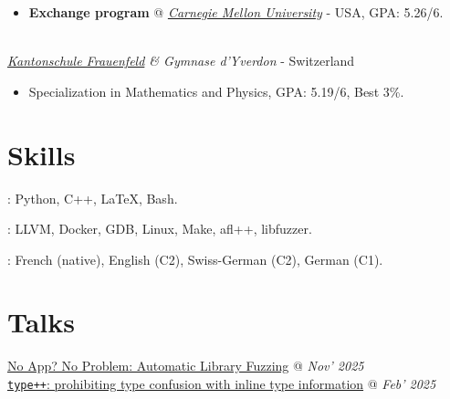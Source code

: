 \documentclass[mm, 11pt]{simple_style}
\begin{document}
\begin{resume}
\begin{itemize}
  \item \textbf{Exchange program} @
\textit{\href{https://www.ece.cmu.edu/}{Carnegie Mellon University}} - USA, GPA: 5.26/6.
\end{itemize}
\\
\textsl{\href{https://www.kanti-frauenfeld.ch/}{Kantonschule Frauenfeld} \& Gymnase d'Yverdon} - Switzerland

\begin{itemize}
  \item Specialization in Mathematics and Physics, GPA: 5.19/6, Best 3\%.
\end{itemize}

\sectionline
\section{Skills}
: Python, C++, \LaTeX, Bash.

: LLVM, Docker, GDB, Linux, Make, afl++, libfuzzer.

: French (native), English (C2), Swiss-German (C2), German (C1).\\
\pagebreak
\sectionline
\section{Talks}
\href{https://www.blackalps.ch/ba-25/talks.php#52}{No App? No Problem: Automatic Library Fuzzing} @ 
\hfill
\textit{Nov' 2025}\\
\href{https://www.ndss-symposium.org/ndss-paper/type-prohibiting-type-confusion-with-inline-type-information/}{\texttt{type++}: prohibiting type confusion with inline type information} @ 
\hfill
\textit{Feb' 2025}

\sectionline

\end{resume}
\end{document}
